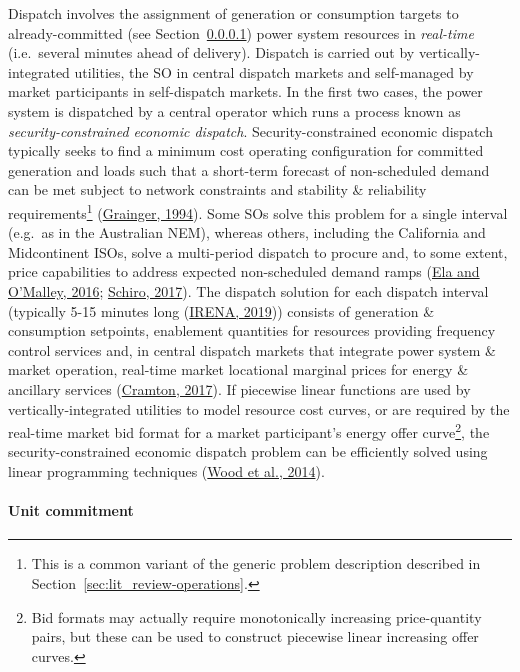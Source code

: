 \documentclass[12pt,a4paper,]{report}
\begin{document}
Dispatch involves the assignment of generation or consumption targets to
already-committed (see
Section~\ref{sec:lit_review-balancing_practices-scheduling-uc}) power
system resources in \emph{real-time} (i.e.~several minutes ahead of
delivery). Dispatch is carried out by vertically-integrated utilities,
the SO in central dispatch markets and self-managed by market
participants in self-dispatch markets. In the first two cases, the power
system is dispatched by a central operator which runs a process known as
\emph{security-constrained economic dispatch}. Security-constrained
economic dispatch typically seeks to find a minimum cost operating
configuration for committed generation and loads such that a short-term
forecast of non-scheduled demand can be met subject to network
constraints and stability \& reliability requirements\footnote{This is a
  common variant of the generic problem description described in
  Section~\ref{sec:lit_review-operations}.}
(\protect\hyperlink{ref-graingerPowerSystemAnalysis1994}{Grainger,
1994}). Some SOs solve this problem for a single interval (e.g.~as in
the Australian NEM), whereas others, including the California and
Midcontinent ISOs, solve a multi-period dispatch to procure and, to some
extent, price capabilities to address expected non-scheduled demand
ramps (\protect\hyperlink{ref-elaSchedulingPricingExpected2016}{Ela and
O'Malley, 2016};
\protect\hyperlink{ref-schiroProcurementPricingRamping2017}{Schiro,
2017}). The dispatch solution for each dispatch interval (typically 5-15
minutes long
(\protect\hyperlink{ref-irenaIncreasingTimeGranularity2019}{IRENA,
2019})) consists of generation \& consumption setpoints, enablement
quantities for resources providing frequency control services and, in
central dispatch markets that integrate power system \& market
operation, real-time market locational marginal prices for energy \&
ancillary services
(\protect\hyperlink{ref-cramtonElectricityMarketDesign2017}{Cramton,
2017}). If piecewise linear functions are used by vertically-integrated
utilities to model resource cost curves, or are required by the
real-time market bid format for a market participant's energy offer
curve\footnote{Bid formats may actually require monotonically increasing
  price-quantity pairs, but these can be used to construct piecewise
  linear increasing offer curves.}, the security-constrained economic
dispatch problem can be efficiently solved using linear programming
techniques
(\protect\hyperlink{ref-woodPowerGenerationOperation2014}{Wood et al.,
2014}).

\hypertarget{sec:lit_review-balancing_practices-scheduling-uc}{%
\paragraph{Unit
commitment}\label{sec:lit_review-balancing_practices-scheduling-uc}}
\end{document}
